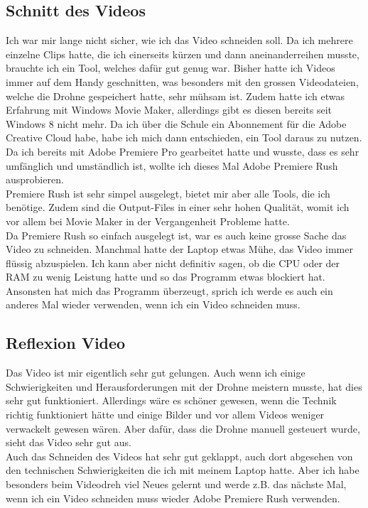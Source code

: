 \documentclass[11pt]{article}
\begin{document}
    \subsection{Schnitt des Videos}
    Ich war mir lange nicht sicher, wie ich das Video schneiden soll. Da ich mehrere einzelne Clips hatte, die ich einerseits kürzen und dann
    aneinanderreihen musste, brauchte ich ein Tool, welches dafür gut genug war. Bisher hatte ich Videos immer auf dem Handy geschnitten, was
    besonders mit den grossen Videodateien, welche die Drohne gespeichert hatte, sehr mühsam ist. Zudem hatte ich etwas Erfahrung mit Windows
    Movie Maker, allerdings gibt es diesen bereits seit Windows 8 nicht mehr. Da ich über die Schule ein Abonnement für die Adobe Creative Cloud
    habe, habe ich mich dann entschieden, ein Tool daraus zu nutzen. Da ich bereits mit Adobe Premiere Pro gearbeitet hatte und wusste, dass
    es sehr umfänglich und umständlich ist, wollte ich dieses Mal Adobe Premiere Rush ausprobieren.\\
    Premiere Rush ist sehr simpel ausgelegt, bietet mir aber alle Tools, die ich benötige. Zudem sind die Output-Files in einer sehr hohen
    Qualität, womit ich vor allem bei Movie Maker in der Vergangenheit Probleme hatte.\\
    Da Premiere Rush so einfach ausgelegt ist, war es auch keine grosse Sache das Video zu schneiden. Manchmal hatte der Laptop etwas Mühe,
    das Video immer flüssig abzuspielen. Ich kann aber nicht definitiv sagen, ob die CPU oder der RAM zu wenig Leistung hatte und so das Programm
    etwas blockiert hat.\\
    Ansonsten hat mich das Programm überzeugt, sprich ich werde es auch ein anderes Mal wieder verwenden, wenn ich ein Video schneiden muss.

    \subsection{Reflexion Video}
    Das Video ist mir eigentlich sehr gut gelungen. Auch wenn ich einige Schwierigkeiten und Herausforderungen mit der Drohne meistern musste,
    hat dies sehr gut funktioniert. Allerdings wäre es schöner gewesen, wenn die Technik richtig funktioniert hätte und einige Bilder und vor allem
    Videos weniger verwackelt gewesen wären. Aber dafür, dass die Drohne manuell gesteuert wurde, sieht das Video sehr gut aus.\\
    Auch das Schneiden des Videos hat sehr gut geklappt, auch dort abgesehen von den technischen Schwierigkeiten die ich mit meinem Laptop hatte.
    Aber ich habe besonders beim Videodreh viel Neues gelernt und werde z.B. das nächste Mal, wenn ich ein Video schneiden muss wieder Adobe
    Premiere Rush verwenden.
\end{document}
